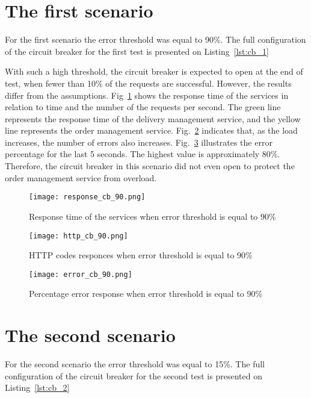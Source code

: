 \section{The first scenario}\label{sec:test_description_1}
For the first scenario the error threshold was equal to 90\%.
The full configuration of the circuit breaker for the first test is presented on Listing~\ref{lst:cb_1}



With such a high threshold, the circuit breaker is expected to open at the end of test, when fewer than 10\% of the requests are successful.
However, the results differ from the assumptions.
Fig~\ref{fig:response-cb-90} shows the response time of the services in relation to time and the number of the requests per second. The green line represents the response time of the delivery management service, and the yellow line represents the order management service.
Fig.~\ref{fig:http-cb-90} indicates that, as the load increases, the number of errors also increases.
Fig.~\ref{fig:error-cb-90} illustrates the error percentage for the last 5 seconds. The highest value is approximately 80\%.
Therefore, the circuit breaker in this scenario did not even open to protect the order management service from overload.

\begin{figure}[t]
    \centering
    \texttt{[image: response\_cb\_90.png]}
    \caption{Response time of the services when error threshold is equal to 90\%}
    \label{fig:response-cb-90}
\end{figure}
\begin{figure}[t]
    \centering
    \texttt{[image: http\_cb\_90.png]}
    \caption{HTTP codes responces when error threshold is equal to 90\%}
    \label{fig:http-cb-90}
\end{figure}
\begin{figure}[t]
    \centering
    \texttt{[image: error\_cb\_90.png]}
    \caption{Percentage error response when error threshold is equal to 90\%}
    \label{fig:error-cb-90}
\end{figure}

\section{The second scenario}\label{sec:test_description_2}
For the second scenario the error threshold was equal to 15\%.
The full configuration of the circuit breaker for the second test is presented on Listing~\ref{lst:cb_2}
\begin{minipage}{\textwidth}

\end{minipage}

